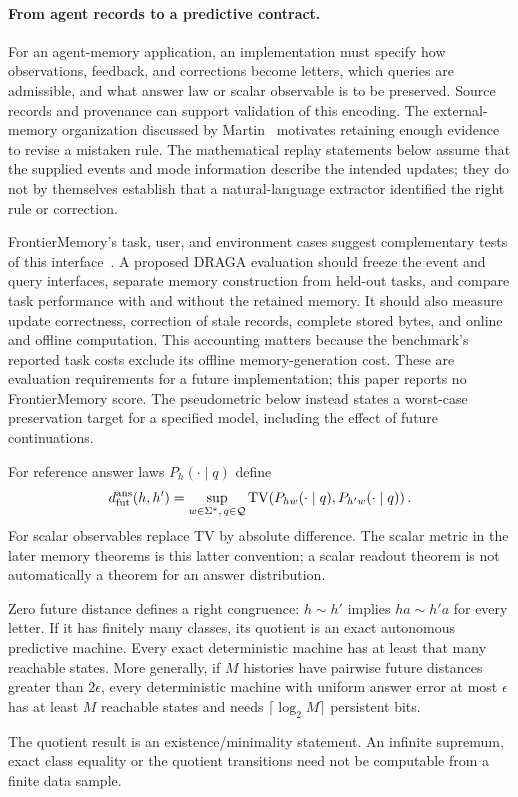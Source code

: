 \paragraph{From agent records to a predictive contract.}
For an agent-memory application, an implementation must specify how
observations, feedback, and corrections become letters, which queries
are admissible, and what answer law or scalar observable is to be
preserved. Source records and provenance can support validation of this
encoding. The external-memory organization discussed by
Martin~\citep{martin2026memory} motivates retaining enough evidence to
revise a mistaken rule. The mathematical replay statements below assume
that the supplied events and mode information describe the intended
updates; they do not by themselves establish that a natural-language
extractor identified the right rule or correction.

FrontierMemory's task, user, and environment cases suggest complementary
tests of this interface~\citep{letta2026frontiermemoryv1}. A proposed
DRAGA evaluation should freeze the event and query interfaces, separate
memory construction from held-out tasks, and compare task performance
with and without the retained memory. It should also measure update
correctness, correction of stale records, complete stored bytes, and
online and offline computation. This accounting matters because the
benchmark's reported task costs exclude its offline memory-generation
cost. These are evaluation requirements for a future implementation;
this paper reports no FrontierMemory score. The pseudometric below
instead states a worst-case preservation target for a specified model,
including the effect of future continuations.

\begin{definition}\label{III:M:def:agent-future}
For reference answer laws $P_h(\cdot\mid q)$ define
\[
 d_{\rm fut}^{\rm ans}(h,h')
 =\sup_{w\in\Sigma^*,\,q\in\mathcal Q}
 \operatorname{TV}\!\left(P_{hw}(\cdot\mid q),P_{h'w}(\cdot\mid q)\right).
\]
For scalar observables replace TV by absolute difference. The scalar
metric in the later memory theorems is this latter convention; a scalar
readout theorem is not automatically a theorem for an answer distribution.
\end{definition}

\begin{proposition}
\label{III:M:prop:agent-quotient}
Zero future distance defines a right congruence:
$h\sim h'$ implies $ha\sim h'a$ for every letter. If it has finitely
many classes, its quotient is an exact autonomous predictive machine.
Every exact deterministic machine has at least that many reachable states.
More generally, if $M$ histories have pairwise future distances greater
than $2\epsilon$, every deterministic machine with uniform answer error at
most $\epsilon$ has at least $M$ reachable states and needs
$\lceil\log_2M\rceil$ persistent bits.
\end{proposition}

The quotient result is an existence/minimality statement. An infinite
supremum, exact class equality or the quotient transitions need not be
computable from a finite data sample.

